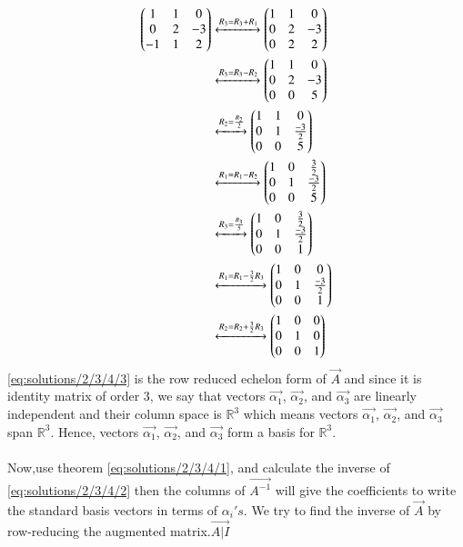 \begin{align}
\begin{pmatrix}1 & 1 &  0 \\ 0 & 2 & -3  \\ -1 & 1 & 2\end{pmatrix} &\xleftrightarrow[]{R_3=R_3+R_1}\begin{pmatrix}1 & 1 &  0 \\ 0 & 2 & -3  \\ 0 & 2 & 2  \end{pmatrix} \\
 &\xleftrightarrow[]{R_3=R_3-R_2}\begin{pmatrix}1 & 1 &  0 \\ 0 & 2 & -3  \\ 0 & 0 & 5  \end{pmatrix} \\
&\xleftrightarrow[]{R_2=\frac{R_2}{2}}\begin{pmatrix}1 & 1 &  0 \\ 0 & 1 &\frac{-3}{2}   \\ 0 & 0 & 5  \end{pmatrix} \\
&\xleftrightarrow[]{R_1=R_1-R_2}\begin{pmatrix}1 & 0 &  \frac{3}{2} \\ 0 & 1 &\frac{-3}{2}   \\ 0 & 0 & 5  \end{pmatrix} \\
&\xleftrightarrow[]{R_3=\frac{R_3}{5}}\begin{pmatrix}1 & 0 &   \frac{3}{2} \\ 0 & 1 & \frac{-3}{2}   \\ 0 & 0 & 1  \end{pmatrix} \\
&\xleftrightarrow[]{R_1=R_1-\frac{3}{2}R_3}\begin{pmatrix}1 & 0 &  0 \\ 0 & 1 & \frac{-3}{2}   \\ 0 & 0 & 1  \end{pmatrix} \\
&\xleftrightarrow[]{R_2=R_2+\frac{3}{2}R_3}\begin{pmatrix}1 & 0 &  0 \\ 0 & 1 & 0  \\ 0 & 0 & 1  \end{pmatrix} \label{eq:solutions/2/3/4/3}
\end{align}
\eqref{eq:solutions/2/3/4/3} is the row reduced echelon form of $\vec{A}$ and since it is identity matrix of order 3, we say that vectors $\vec{\alpha_1}$, $\vec{\alpha_2}$, and $\vec{\alpha_3}$  are linearly independent and their column space is $\mathbb{R}^3$ which means vectors $\vec{\alpha_1}$, $\vec{\alpha_2}$, and $\vec{\alpha_3}$  span $\mathbb{R}^3$.
Hence, vectors $\vec{\alpha_1}$, $\vec{\alpha_2}$, and $\vec{\alpha_3}$ form a basis for $\mathbb{R}^3$.\\\\
Now,use theorem \eqref{eq:solutions/2/3/4/1}, and calculate the inverse of \eqref{eq:solutions/2/3/4/2}
then the columns of $\vec{A^{-1}}$ will give the coefficients to write the standard basis vectors in terms of $\alpha_i's$. We try to find the inverse of $\vec{A}$ by row-reducing the augmented matrix.$\vec{A|I}$ 

